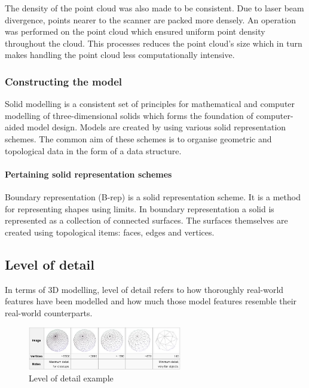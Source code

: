 \documentclass[11pt,a4paper]{report}
\begin{document}
					The density of the point cloud was also made to be consistent. Due to laser beam divergence, points nearer to the scanner are packed more densely. An operation was performed on the point cloud which ensured uniform point density throughout the cloud. This processes reduces the point cloud's size which in turn makes handling the point cloud less computationally intensive.
					\cite{_selection_????}
				
			\subsubsection{Constructing the model}
				Solid modelling is a consistent set of principles for mathematical and computer modelling of three-dimensional solids which forms the foundation of computer-aided model design. 
				\cite{vadim_shapiro_solid_2001}
				Models are created by using various solid representation schemes. The common aim of these schemes is to organise geometric and topological data in the form of a data structure. 
				
				\paragraph{Pertaining solid representation schemes}
					Boundary representation (B-rep) is a solid representation scheme. It is a method for representing shapes using limits. In boundary representation a solid is represented as a collection of connected surfaces. The surfaces themselves are created using topological items: faces, edges and vertices.
					\cite{hongxin_zhang_introduction_2007}
				
		\subsection{Level of detail}
			In terms of 3D modelling, level of detail refers to how thoroughly real-world features have been modelled and how much those model features resemble their real-world counterparts.
			
			\begin{figure}[h!]
				\centering
				\includegraphics[width=0.6\textwidth]{level_of_detail_example}
				\caption{Level of detail example}
			\end{figure}
			
\end{document}
